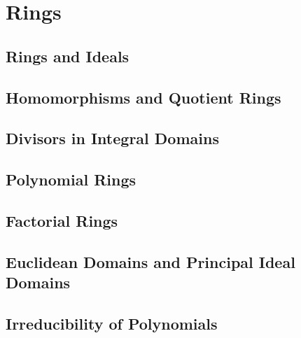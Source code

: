 
\part{Rings}\label{cha:rings}
\chapter{Rings and Ideals}
\chapter{Homomorphisms and Quotient Rings}
\chapter{Divisors in Integral Domains}
\chapter{Polynomial Rings}
\chapter{Factorial Rings}
\chapter{Euclidean Domains and Principal Ideal Domains}
\chapter{Irreducibility of Polynomials}
